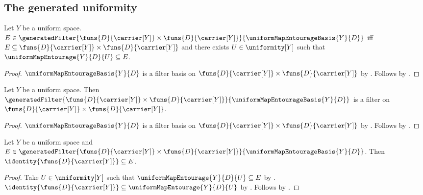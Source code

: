 \subsection{The generated uniformity}

\begin{proposition}\label{uniform_map_generated_uniformity_iff}
    Let $Y$ be a uniform space.
    $E\in\generatedFilter
        {\funs{D}{\carrier[Y]}\times\funs{D}{\carrier[Y]}}
        {\uniformMapEntourageBasis{Y}{D}}$ iff
        $E\subseteq\funs{D}{\carrier[Y]}\times\funs{D}{\carrier[Y]}$ and
        there exists $U\in\uniformity[Y]$ such that
            $\uniformMapEntourage{Y}{D}{U}\subseteq E$.
\end{proposition}
\begin{proof}
    $\uniformMapEntourageBasis{Y}{D}$ is a filter basis on
        $\funs{D}{\carrier[Y]}\times\funs{D}{\carrier[Y]}$ by
        .
    Follows by
        .
\end{proof}

\begin{theorem}\label{uniform_map_generated_uniformity_is_filter}
    Let $Y$ be a uniform space.
    Then $\generatedFilter
        {\funs{D}{\carrier[Y]}\times\funs{D}{\carrier[Y]}}
        {\uniformMapEntourageBasis{Y}{D}}$ is a filter on
        $\funs{D}{\carrier[Y]}\times\funs{D}{\carrier[Y]}$.
\end{theorem}
\begin{proof}
    $\uniformMapEntourageBasis{Y}{D}$ is a filter basis on
        $\funs{D}{\carrier[Y]}\times\funs{D}{\carrier[Y]}$ by
        .
    Follows by .
\end{proof}

\begin{proposition}\label{uniform_map_generated_uniformity_diagonal}
    Let $Y$ be a uniform space and
        $E\in\generatedFilter
            {\funs{D}{\carrier[Y]}\times\funs{D}{\carrier[Y]}}
            {\uniformMapEntourageBasis{Y}{D}}$.
    Then $\identity{\funs{D}{\carrier[Y]}}\subseteq E$.
\end{proposition}
\begin{proof}
    Take $U\in\uniformity[Y]$ such that
        $\uniformMapEntourage{Y}{D}{U}\subseteq E$ by
        .
    $\identity{\funs{D}{\carrier[Y]}}\subseteq
        \uniformMapEntourage{Y}{D}{U}$ by
        .
    Follows by .
\end{proof}

